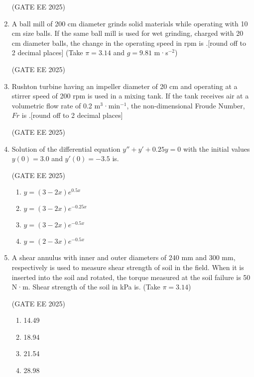 \documentclass[journal,12pt,onecolumn]{IEEEtran}
\theoremstyle{remark}
\begin{document}
\begin{enumerate}
\hfill(GATE EE 2025)

\item A ball mill of 200 cm diameter grinds solid materials while operating with 10 cm size balls. If the same ball mill is used for wet grinding, charged with 20 cm diameter balls, the change in the operating speed in rpm is \underline{\hspace{2cm}}.{[round off to 2 decimal places] (Take $\pi = 3.14$ and $g = 9.81$ m·s$^{-2}$)}

\hfill(GATE EE 2025)

\item Rushton turbine having an impeller diameter of 20 cm and operating at a stirrer speed of 200 rpm is used in a mixing tank. If the tank receives air at a volumetric flow rate of 0.2 m$^{3}$·min$^{-1}$, the non-dimensional Froude Number, $Fr$ is \underline{\hspace{2cm}}.{[round off to 2 decimal places]}

\hfill(GATE EE 2025)

\item Solution of the differential equation $y'' + y' + 0.25y = 0$ with the initial values $y(0) = 3.0$ and $y'(0) = -3.5$ is.

\hfill(GATE EE 2025)

\begin{multicols}{4}
\begin{enumerate}[label=(\Alph*)]
\item $y = (3 - 2x)e^{0.5x}$
\item $y = (3 - 2x)e^{-0.25x}$
\item $y = (3 - 2x)e^{-0.5x}$
\item $y = (2 - 3x)e^{-0.5x}$
\end{enumerate}
\end{multicols}

\item A shear annulus with inner and outer diameters of 240 mm and 300 mm, respectively is used to measure shear strength of soil in the field. When it is inserted into the soil and rotated, the torque measured at the soil failure is 50 N·m. Shear strength of the soil in kPa is. (Take $\pi = 3.14$)

\hfill(GATE EE 2025)

\begin{multicols}{4}
\begin{enumerate}
\item 14.49
\item 18.94
\item 21.54
\item 28.98
\end{enumerate}
\end{multicols}


\end{enumerate}
\end{document}
